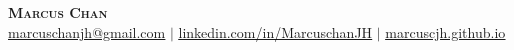 \begin{center}
    \textbf{\Huge \scshape Marcus Chan} \\ \vspace{1pt}
    \small \href{mailto:marcuschanjh@gmail.com}{\underline{marcuschanjh@gmail.com}} $|$
    \href{https://linkedin.com/in/MarcuschanJH}{\underline{linkedin.com/in/MarcuschanJH}} $|$
    \href{https://marcuscjh.github.io}{\underline{marcuscjh.github.io}}
\end{center}